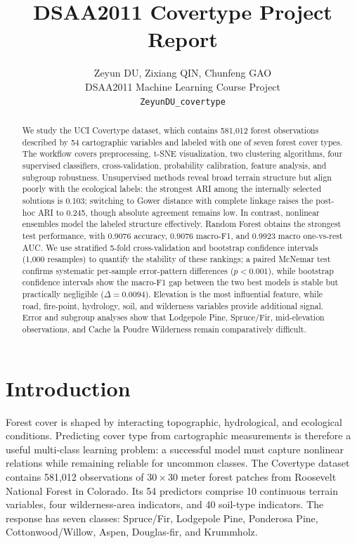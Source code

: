 \documentclass{article}
\title{DSAA2011 Covertype Project Report}
\author{%
  Zeyun DU, Zixiang QIN, Chunfeng GAO\\
  DSAA2011 Machine Learning Course Project\\
  \texttt{ZeyunDU\_covertype}
}
\begin{document}
\maketitle

\begin{abstract}
We study the UCI Covertype dataset, which contains 581,012 forest observations described by 54 cartographic variables and labeled with one of seven forest cover types. The workflow covers preprocessing, t-SNE visualization, two clustering algorithms, four supervised classifiers, cross-validation, probability calibration, feature analysis, and subgroup robustness. Unsupervised methods reveal broad terrain structure but align poorly with the ecological labels: the strongest ARI among the internally selected solutions is 0.103; switching to Gower distance with complete linkage raises the post-hoc ARI to 0.245, though absolute agreement remains low. In contrast, nonlinear ensembles model the labeled structure effectively. Random Forest obtains the strongest test performance, with 0.9076 accuracy, 0.9076 macro-F1, and 0.9923 macro one-vs-rest AUC.  We use stratified 5-fold cross-validation and bootstrap confidence intervals (1,000 resamples) to quantify the stability of these rankings; a paired McNemar test confirms systematic per-sample error-pattern differences ($p<0.001$), while bootstrap confidence intervals show the macro-F1 gap between the two best models is stable but practically negligible ($\Delta = 0.0094$).  Elevation is the most influential feature, while road, fire-point, hydrology, soil, and wilderness variables provide additional signal. Error and subgroup analyses show that Lodgepole Pine, Spruce/Fir, mid-elevation observations, and Cache la Poudre Wilderness remain comparatively difficult.
\end{abstract}

\section{Introduction}

Forest cover is shaped by interacting topographic, hydrological, and ecological conditions. Predicting cover type from cartographic measurements is therefore a useful multi-class learning problem: a successful model must capture nonlinear relations while remaining reliable for uncommon classes. The Covertype dataset \cite{blackard1998comparison,blackard1999comparative,uci} contains 581,012 observations of $30\times30$ meter forest patches from Roosevelt National Forest in Colorado. Its 54 predictors comprise 10 continuous terrain variables, four wilderness-area indicators, and 40 soil-type indicators. The response has seven classes: Spruce/Fir, Lodgepole Pine, Ponderosa Pine, Cottonwood/Willow, Aspen, Douglas-fir, and Krummholz.
\end{document}
